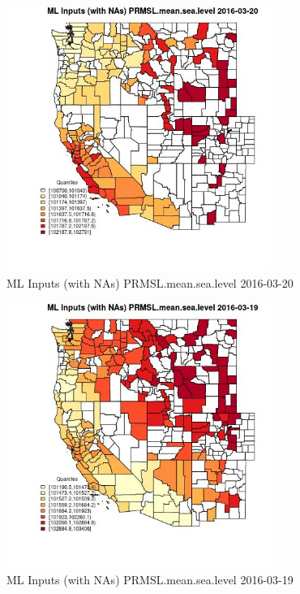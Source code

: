 \begin{figure} 
\centering  
\includegraphics[width=0.77\textwidth]{Code_Outputs/Report_ML_input_PM25_Step4_part_e_de_duplicated_aveswNAs_CountyPRMSLmeansealevelMean2016-03-20_2016-03-20.jpg} 
\caption{\label{fig:Report_ML_input_PM25_Step4_part_e_de_duplicated_aveswNAsCountyPRMSLmeansealevelMean2016-03-20_2016-03-20}ML Inputs (with NAs) PRMSL.mean.sea.level 2016-03-20} 
\end{figure} 
 

\begin{figure} 
\centering  
\includegraphics[width=0.77\textwidth]{Code_Outputs/Report_ML_input_PM25_Step4_part_e_de_duplicated_aveswNAs_CountyPRMSLmeansealevelMean2016-03-19_2016-03-19.jpg} 
\caption{\label{fig:Report_ML_input_PM25_Step4_part_e_de_duplicated_aveswNAsCountyPRMSLmeansealevelMean2016-03-19_2016-03-19}ML Inputs (with NAs) PRMSL.mean.sea.level 2016-03-19} 
\end{figure} 
 

